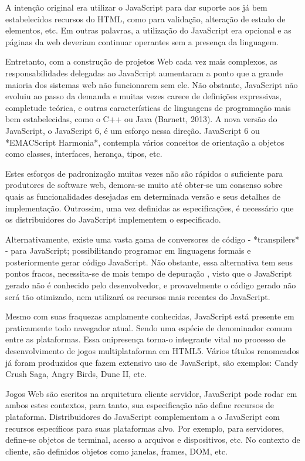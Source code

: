 \documentclass[11pt,a4paper]{article}
\begin{document}
A intenção original era utilizar o JavaScript para dar suporte aos já
bem estabelecidos recursos do HTML, como para validação, alteração
de estado de elementos, etc. Em outras palavras, a utilização do
JavaScript era opcional e as páginas da web deveriam continuar
operantes sem a presença da linguagem.

Entretanto, com a construção de projetos Web cada vez mais complexos,
as responsabilidades delegadas ao JavaScript aumentaram a ponto que a
grande maioria dos sistemas web não funcionarem sem ele. Não obstante,
JavaScript não evoluiu ao passo da demanda e muitas vezes carece de
definições expressivas, completude teórica, e outras características
de linguagens de programação mais bem estabelecidas, como o C++ ou
Java (Barnett, 2013). A nova versão do JavaScript, o JavaScript 6, é
um esforço nessa direção. JavaScript 6 ou *EMACScript Harmonia*,
contempla vários conceitos de orientação a objetos como classes,
interfaces, herança, tipos, etc.

Estes esforços de padronização muitas vezes não são rápidos
o suficiente para produtores de software web, demora-se muito até
obter-se um consenso sobre quais as funcionalidades desejadas em
determinada versão e seus detalhes de implementação. Outrossim, uma
vez definidas as especificações, é necessário que os distribuidores
do JavaScript implementem o especificado.

Alternativamente, existe uma vasta gama de conversores de código -
*transpilers* - para JavaScript; possibilitando programar em linguagens
formais e posteriormente gerar código JavaScript. Não obstante,
essa alternativa tem seus pontos fracos, necessita-se de mais tempo
de depuração , visto que o JavaScript gerado não é conhecido
pelo desenvolvedor, e provavelmente o código gerado não será tão
otimizado, nem utilizará os recursos mais recentes do JavaScript.

Mesmo com suas fraquezas amplamente conhecidas, JavaScript está
presente em praticamente todo navegador atual. Sendo uma espécie de
denominador comum entre as plataformas. Essa onipresença torna-o
integrante vital no processo de desenvolvimento de jogos multiplataforma
em HTML5. Vários títulos renomeados já foram produzidos que fazem
extensivo uso de JavaScript, são exemplos: Candy Crush Saga, Angry
Birds, Dune II, etc.

Jogos Web são escritos na arquitetura cliente servidor, JavaScript pode
rodar em ambos estes contextos, para tanto, sua especificação não
define recursos de plataforma. Distribuidores do JavaScript complementam
a o JavaScript com recursos específicos para suas plataformas alvo.
Por exemplo, para servidores, define-se objetos de terminal, acesso a
arquivos e dispositivos, etc. No contexto de cliente, são definidos
objetos como janelas, frames, DOM, etc.
\end{document}
